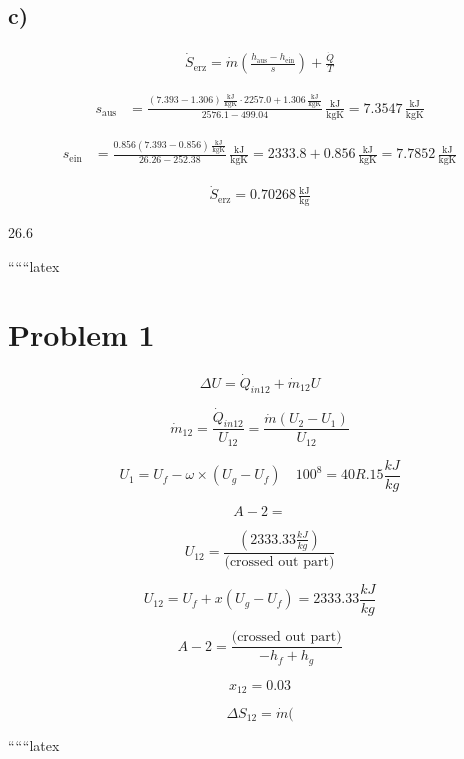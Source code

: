 

\subsection*{c)}
\begin{align*}
\dot{S}_{\text{erz}} = \dot{m} \left( \frac{h_{\text{aus}} - h_{\text{ein}}}{s} \right) + \frac{\dot{Q}}{T}
\end{align*}

\begin{align*}
s_{\text{aus}} &= \frac{(7.393 - 1.306) \, \frac{\text{kJ}}{\text{kgK}} \cdot 2257.0 + 1.306 \, \frac{\text{kJ}}{\text{kgK}}}{2576.1 - 499.04} \, \frac{\text{kJ}}{\text{kgK}} = 7.3547 \, \frac{\text{kJ}}{\text{kgK}}
\end{align*}

\begin{align*}
s_{\text{ein}} &= \frac{0.856 (7.393 - 0.856) \, \frac{\text{kJ}}{\text{kgK}}}{26.26 - 252.38} \, \frac{\text{kJ}}{\text{kgK}} = 2333.8 + 0.856 \, \frac{\text{kJ}}{\text{kgK}} = 7.7852 \, \frac{\text{kJ}}{\text{kgK}}
\end{align*}

\begin{align*}
\dot{S}_{\text{erz}} = 0.70268 \, \frac{\text{kJ}}{\text{kg}}
\end{align*}

26.6 \, 

``````latex

\section*{Problem 1}

\[
\Delta U = \dot{Q}_{in12} + \dot{m}_{12} U
\]

\[
\dot{m}_{12} = \frac{\dot{Q}_{in12}}{U_{12}} = \frac{\dot{m}(U_2 - U_1)}{U_{12}}
\]

\[
U_1 = U_f - \omega \times (U_g - U_f) \quad 100^8 = 40R.15 \frac{kJ}{kg}
\]

\[
A-2 = 
\]

\[
U_{12} = \frac{(2333.33 \frac{kJ}{kg})}{\text{(crossed out part)}}
\]

\[
U_{12} = U_f + x(U_g - U_f) = 2333.33 \frac{kJ}{kg}
\]

\[
A-2 = \frac{\text{(crossed out part)}}{-h_f + h_g}
\]

\[
x_{12} = 0.03
\]

\[
\Delta S_{12} = \dot{m}(
\]

``````latex